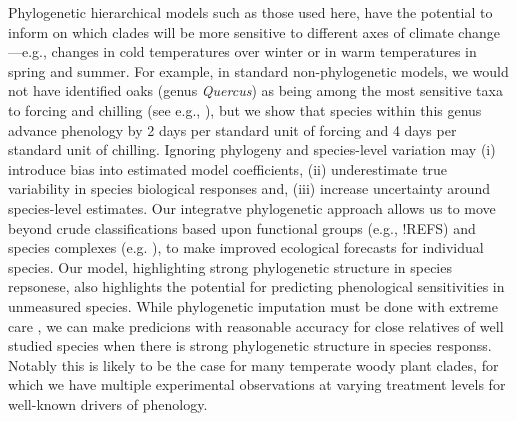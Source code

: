 \documentclass{article}\usepackage[]{graphicx}\usepackage[]{color}
\begin{document}
Phylogenetic hierarchical models such as those used here, have the potential to inform on which clades will be more sensitive to different axes of climate change---e.g., changes in cold temperatures over winter or in warm temperatures in spring and summer. For example, in standard non-phylogenetic models, we would not have identified oaks (genus \emph{Quercus}) as being among the most sensitive taxa to forcing and chilling (see e.g., \citep{ettinger2020}), but we show that species within this genus advance phenology by 2 days per standard unit of forcing and 4 days per standard unit of chilling. Ignoring phylogeny and species-level variation may (i) introduce bias into estimated model coefficients, (ii) underestimate true variability in species biological responses and, (iii) increase uncertainty around species-level estimates. Our integratve phylogenetic approach allows us to move beyond crude classifications based upon functional groups (e.g., !REFS) and species complexes (e.g. \cite{ettinger2020}), to make improved ecological forecasts for individual species. Our model, highlighting strong phylogenetic structure in species repsonese, also highlights the potential for predicting phenological sensitivities in unmeasured species. While phylogenetic imputation must be done with extreme care \citep{molina2018assessing}, we can make predicions with reasonable accuracy for close relatives of well studied species when there is strong phylogenetic structure in species responss. Notably this is likely to be the case for many temperate woody plant clades, for which we have multiple experimental observations at varying treatment levels for well-known drivers of phenology.\\ 
\end{document}
